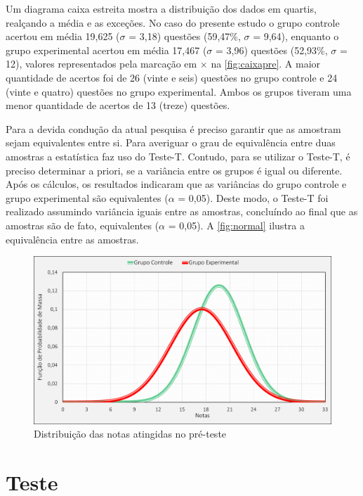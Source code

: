 Um diagrama caixa estreita mostra a distribuição dos dados em quartis, realçando a média e as exceções. No caso do presente estudo o grupo controle acertou em média 19,625 ($\sigma$ = 3,18) questões (59,47\%, $\sigma$ = 9,64), enquanto o grupo experimental acertou em média 17,467 ($\sigma$ = 3,96) questões (52,93\%, $\sigma$ = 12), valores representados pela marcação em $\times$ na \autoref{fig:caixapre}. A maior quantidade de acertos foi de 26 (vinte e seis) questões no grupo controle e 24 (vinte e quatro) questões no grupo experimental. Ambos os grupos tiveram uma menor quantidade de acertos de 13 (treze) questões.

Para a devida condução da atual pesquisa é preciso garantir que as amostram sejam equivalentes entre si. Para averiguar o grau de equivalência entre duas amostras a estatística faz uso do Teste-T. Contudo, para se utilizar o Teste-T, é preciso determinar a priori, se a variância entre os grupos é igual ou diferente. Após os cálculos, os resultados indicaram que as  variâncias do grupo controle e grupo experimental são equivalentes ($\alpha$ = 0,05). Deste modo, o Teste-T foi realizado assumindo variância iguais entre as amostras, concluíndo ao final que as amostras são de fato, equivalentes ($\alpha$ = 0,05). A \autoref{fig:normal} ilustra a equivalência entre as amostras. 

\begin{figure}[htb]
    \centering
    \caption{\label{fig:normal}Distribuição das notas atingidas no pré-teste}
    \includegraphics[width=\linewidth]{./Visuais/Graficos1.pdf}
  
\end{figure}


\section{Teste}\label{sec:tes}

